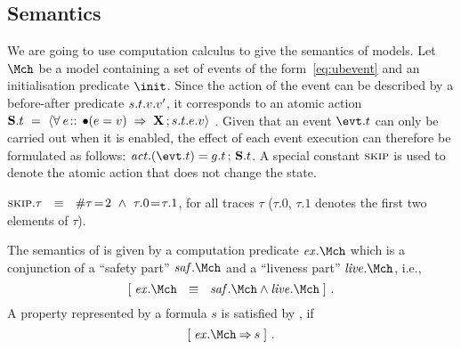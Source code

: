 \subsection{Semantics} We are going to use computation calculus to
give the semantics of \unitb models.  Let $\Mch$ be a \unitb model
containing a set of events of the form~\eqref{eq:ubevent} and an
initialisation predicate $\init$.  
Since the action of the event can be described by a before-after
predicate $s.t.v.v'$, it corresponds to an atomic action
$\mathbf{S}.t ~=~ { \langle \forall \:e\!:\, \!:\, \bullet (e = v) ~\mathbin\Rightarrow~ \mathbf{X} \, ;
  s.t.e.v \rangle }$%
.  Given that an event $\evt.t$ can only be carried out when it is
enabled, the effect of each event execution can therefore be
formulated as follows: $\action.(\evt.t) = \guard.t\,;\,\Action.t$.
A special constant $\textsc{skip}$ is used to denote the atomic action that
does not change the state.
\begin{Definition}
  $\textsc{skip}.\tau  ~~\equiv~~  \# \tau \!=\! 2 ~\land~ \tau.0\! =\! \tau.1$,
  for all traces $\tau$ ($\tau.0$, $\tau.1$ denotes the first two
  elements of $\tau$).
\end{Definition}


The semantics of \Mch is given by a computation predicate $\execution.\Mch$
which is a conjunction of a ``safety part'' $\safety.\Mch$ and a
``liveness part'' $\liveness.\Mch$, i.e., 
\begin{equation}
  \ew{\execution.\Mch \Wide{\eqv} \safety.\Mch \land \liveness.\Mch}~.\label{eq:execution}
\end{equation}
A property represented by a formula $s$ is satisfied by \Mch, if
\begin{equation}
  \ew{\execution.\Mch \limp s}~.\label{eq:property}
\end{equation}

